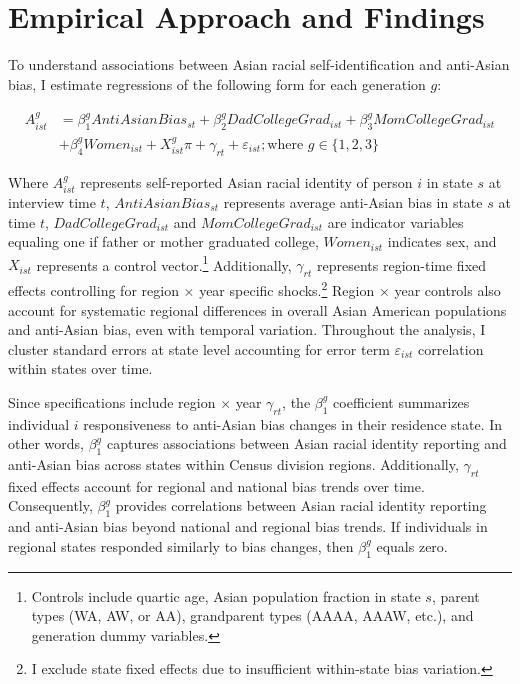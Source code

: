 \section{Empirical Approach and Findings}\label{sec:empstrat}

To understand associations between Asian racial self-identification and anti-Asian bias, I estimate regressions of the following form for each generation $g$:

\begin{align}
A_{ist}^g &= \beta_1^g AntiAsianBias_{st} + \beta_2^g DadCollegeGrad_{ist} + \beta_3^g MomCollegeGrad_{ist} \nonumber \\ 
            &+ \beta_4^g Women_{ist} + X_{ist}^g\pi + \gamma_{rt} 
           + \varepsilon_{ist}; 
           \text{where } g \in \{1,2,3\} \label{eq:identity_reg_bias}
\end{align}

Where $A_{ist}^g$ represents self-reported Asian racial identity of person $i$ in state $s$ at interview time $t$, $AntiAsianBias_{st}$ represents average anti-Asian bias in state $s$ at time $t$, $DadCollegeGrad_{ist}$ and $MomCollegeGrad_{ist}$ are indicator variables equaling one if father or mother graduated college, $Women_{ist}$ indicates sex, and $X_{ist}$ represents a control vector.\footnote{Controls include quartic age, Asian population fraction in state $s$, parent types (WA, AW, or AA), grandparent types (AAAA, AAAW, etc.), and generation dummy variables.} Additionally, $\gamma_{rt}$ represents region-time fixed effects controlling for region $\times$ year specific shocks.\footnote{I exclude state fixed effects due to insufficient within-state bias variation.} Region $\times$ year controls also account for systematic regional differences in overall Asian American populations and anti-Asian bias, even with temporal variation. Throughout the analysis, I cluster standard errors at state level accounting for error term $\varepsilon_{ist}$ correlation within states over time.

Since specifications include region $\times$ year $\gamma_{rt}$, the $\beta_1^g$ coefficient summarizes individual $i$ responsiveness to anti-Asian bias changes in their residence state. In other words, $\beta_1^g$ captures associations between Asian racial identity reporting and anti-Asian bias across states within Census division regions. Additionally, $\gamma_{rt}$ fixed effects account for regional and national bias trends over time. Consequently, $\beta_1^g$ provides correlations between Asian racial identity reporting and anti-Asian bias beyond national and regional bias trends. If individuals in regional states responded similarly to bias changes, then $\beta_1^g$ equals zero.

